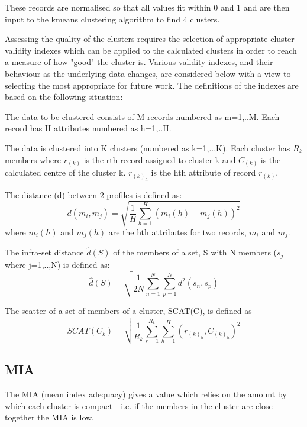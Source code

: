 \documentclass[conference]{IEEEtran}
\begin{document}
These records are normalised so that all values fit within 0 and 1 and are then input to the kmeans clustering algorithm to find 4 clusters.

Assessing the quality of the clusters requires the selection of appropriate cluster validity indexes which can be applied to the calculated clusters in order to reach a measure of how "good" the cluster is. Various validity indexes, and their behaviour as the underlying data changes, are considered below with a view to selecting the most appropriate for future work.
The definitions of the indexes are based on the following situation:

The data to be clustered consists of M records numbered as m=1,..M. Each record has H attributes numbered as h=1,..H.

The data is clustered into K clusters (numbered as k=1,..,K). Each cluster has $R_{k}$ members where $r_{(k)}$ is the rth record assigned to cluster k and $C_{(k)}$ is the calculated centre of the cluster k. $r_{(k)_h}$ is the hth attribute of record $r_{(k)}$.

The distance (d) between 2 profiles is defined as:
\begin{equation}
d(m_{i},m_{j}) = \sqrt{ \frac{1}{H} \sum\limits_{h=1}^H (m_i(h) - m_j(h))^2}
\end{equation}
where $m_i(h)$ and $m_j(h)$ are the hth attributes for two records, $m_i$ and $m_j$.

The infra-set distance $\hat{d}(S)$ of the members of a set, S with N members ($s_j$ where j=1,..,N) is defined as:
\begin{equation}
\hat{d}(S) = \sqrt{ \frac{1}{2N} \sum\limits_{n=1}^{N} \sum\limits_{p=1}^{N} d^{2}(s_n, s_p)}
\end{equation}

The scatter of a set of members of a cluster, SCAT(C), is defined as
\begin{equation}
SCAT(C_k) = \sqrt{ \frac{1}{R_k} \sum\limits_{r=1}^{R_k} \sum\limits_{h=1}^{H}
 (r_{(k)_h}, C_{(k)_h})^2 }
\end{equation}

\subsection{MIA}

The MIA (mean index adequacy) \cite{chicco2003customer} gives a value which relies on the amount by which each cluster is compact - i.e. if the members in the cluster are close together the MIA is low. 
\end{document}
